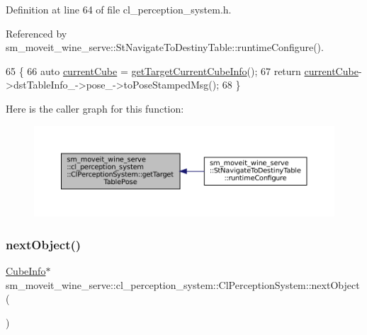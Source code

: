 Definition at line 64 of file cl\+\_\+perception\+\_\+system.\+h.



Referenced by sm\+\_\+moveit\+\_\+wine\+\_\+serve\+::\+St\+Navigate\+To\+Destiny\+Table\+::runtime\+Configure().


\begin{DoxyCode}
65             \{
66                 \textcolor{keyword}{auto} \hyperlink{classsm__moveit__wine__serve_1_1cl__perception__system_1_1ClPerceptionSystem_a2b902d074d73aac23e3525646e08d50f}{currentCube} = \hyperlink{classsm__moveit__wine__serve_1_1cl__perception__system_1_1ClPerceptionSystem_a13bcd31217e9eda88d966d3ec142a465}{getTargetCurrentCubeInfo}();
67                 \textcolor{keywordflow}{return} \hyperlink{classsm__moveit__wine__serve_1_1cl__perception__system_1_1ClPerceptionSystem_a2b902d074d73aac23e3525646e08d50f}{currentCube}->dstTableInfo\_->pose\_->toPoseStampedMsg();
68             \}
\end{DoxyCode}
Here is the caller graph for this function\+:
\nopagebreak
\begin{figure}[H]
\begin{center}
\leavevmode
\includegraphics[width=350pt]{classsm__moveit__wine__serve_1_1cl__perception__system_1_1ClPerceptionSystem_af3691cf60b48afb75b347d38c0285c17_icgraph}
\end{center}
\end{figure}
\mbox{\label{classsm__moveit__wine__serve_1_1cl__perception__system_1_1ClPerceptionSystem_abe32b5f5342f3e9ab6d9d46138ac1fc6}} 
\subsubsection{\texorpdfstring{next\+Object()}{nextObject()}}
{\footnotesize\ttfamily \hyperlink{structsm__moveit__wine__serve_1_1cl__perception__system_1_1CubeInfo}{Cube\+Info}$\ast$ sm\+\_\+moveit\+\_\+wine\+\_\+serve\+::cl\+\_\+perception\+\_\+system\+::\+Cl\+Perception\+System\+::next\+Object (\begin{DoxyParamCaption}{ }\end{DoxyParamCaption})\hspace{0.3cm}{\ttfamily [inline]}}



